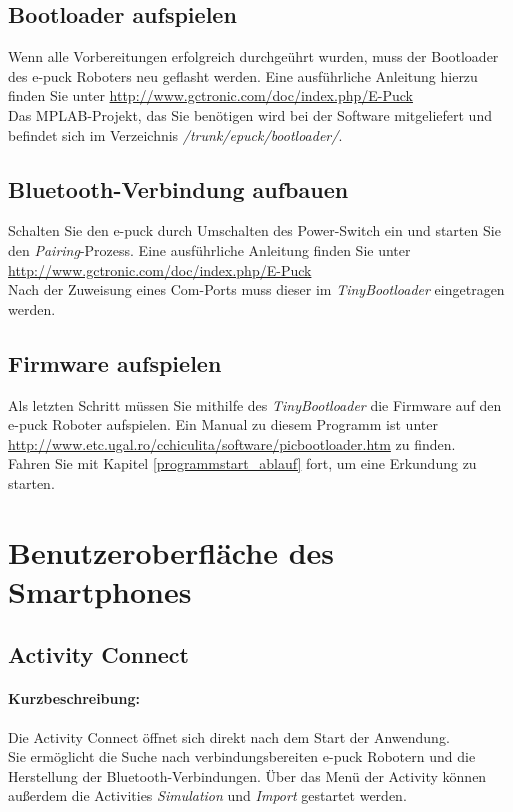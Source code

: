 \documentclass[10pt,a4paper]{article}
\let\oldsection\section
\renewcommand{\section}{\newpage \oldsection}
\begin{document}
			\subsection{Bootloader aufspielen} 
				Wenn alle Vorbereitungen erfolgreich durchge\"uhrt wurden, muss der Bootloader des e-puck Roboters neu geflasht werden. Eine ausf\"uhrliche
				Anleitung hierzu finden Sie unter \url{http://www.gctronic.com/doc/index.php/E-Puck} \\
				Das MPLAB-Projekt, das Sie ben\"otigen wird bei der Software mitgeliefert und befindet sich im Verzeichnis \textit{/trunk/epuck/bootloader/}.
			\subsection{Bluetooth-Verbindung aufbauen} 
				Schalten Sie den e-puck durch Umschalten des Power-Switch ein und starten Sie den \textit{Pairing}-Prozess. Eine ausf\"uhrliche Anleitung finden Sie
				unter \\  \url{http://www.gctronic.com/doc/index.php/E-Puck} \\
				Nach der Zuweisung eines Com-Ports muss dieser im \textit{TinyBootloader} eingetragen werden.			
			\subsection{Firmware aufspielen} 
				Als letzten Schritt m\"ussen Sie mithilfe des \textit{TinyBootloader} die Firmware auf den e-puck Roboter aufspielen. Ein Manual zu diesem Programm
				ist unter \\ \url{http://www.etc.ugal.ro/cchiculita/software/picbootloader.htm} zu finden. \\
				Fahren Sie mit Kapitel \ref{programmstart_ablauf} fort, um eine Erkundung zu starten.
\section{Benutzeroberfl\"ache des Smartphones}
\label{benutzeroberflaeche}
	\subsection{Activity Connect}
		\paragraph*{Kurzbeschreibung:}
		Die Activity Connect \"offnet sich direkt nach dem Start der Anwendung. \\	
		Sie ermöglicht die Suche nach verbindungsbereiten e-puck Robotern und die Herstellung der Bluetooth-Verbindungen.
		Über das Men\"u der Activity können außerdem die Activities \textit{Simulation} und \textit{Import} gestartet werden.
\end{document}
